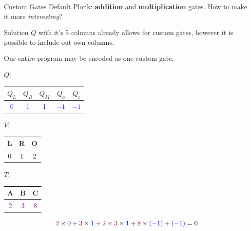 \documentclass{zkdl-presentation-template}
\begin{document}
    \begin{frame} {Custom Gates}
        Default Plonk: \textbf{addition} and \textbf{multiplication} gates.
        How to make it more \textit{interesting}?
        \begin{block}{Solution}
            $Q$ with it's 5 columns already allows for custom gates, however it is possible to include out own columns.
        \end{block}

        \begin{example}
            Our entire program may be encoded as one custom gate.
            \begin{center}
            \scriptsize
            $Q$: 
                \begin{tabular}{|c|c|c|c|c|}
                    \hline
                    $Q_L$ & $Q_R$ & $Q_M$ & $Q_o$ & $Q_c$ \\ 
                    \hline
                    \textcolor{blue}{0} & \textcolor{blue}{1} & \textcolor{blue}{1} & \textcolor{blue}{$-1$} & \textcolor{blue}{$-1$} \\ 
                    \hline
                \end{tabular}
            \quad $V$:
                \begin{tabular}{|c|c|c|}
                    \hline
                    L & R & O \\
                    \hline
                    0 & 1 & 2 \\
                    \hline
                \end{tabular}
            \quad $T$:
                \begin{tabular}{|c|c|c|}
                    \hline
                    A & B & C \\
                    \hline
                    \textcolor{purple}{2} & \textcolor{purple}{3} & \textcolor{purple}{8} \\
                    \hline
                \end{tabular}
            \end{center}

            \begin{equation*}
                \textcolor{purple}{2} \times \textcolor{blue}{0} + \textcolor{purple}{3} \times \textcolor{blue}{1} + \textcolor{purple}{2} \times \textcolor{purple}{3} \times \textcolor{blue}{1} + \textcolor{purple}{8} \times \textcolor{blue}{(-1)} + \textcolor{blue}{(-1)} = 0
            \end{equation*}
        \end{example}
    \end{frame}
\end{document}

